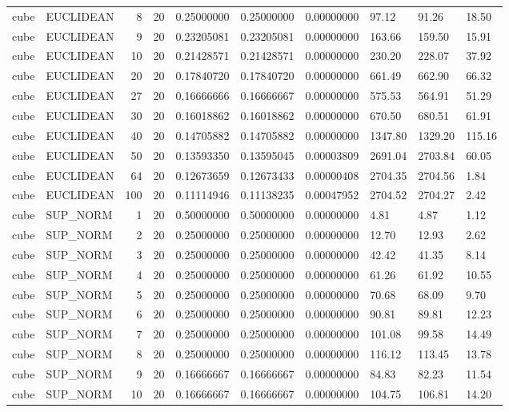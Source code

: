 \begin{longtable}{llrrllllll}
cube & EUCLIDEAN & 8 & 20 & 0.25000000 & 0.25000000 & 0.00000000 & 97.12 & 91.26 & 18.50 \\
cube & EUCLIDEAN & 9 & 20 & 0.23205081 & 0.23205081 & 0.00000000 & 163.66 & 159.50 & 15.91 \\
cube & EUCLIDEAN & 10 & 20 & 0.21428571 & 0.21428571 & 0.00000000 & 230.20 & 228.07 & 37.92 \\
cube & EUCLIDEAN & 20 & 20 & 0.17840720 & 0.17840720 & 0.00000000 & 661.49 & 662.90 & 66.32 \\
cube & EUCLIDEAN & 27 & 20 & 0.16666666 & 0.16666667 & 0.00000000 & 575.53 & 564.91 & 51.29 \\
cube & EUCLIDEAN & 30 & 20 & 0.16018862 & 0.16018862 & 0.00000000 & 670.50 & 680.51 & 61.91 \\
cube & EUCLIDEAN & 40 & 20 & 0.14705882 & 0.14705882 & 0.00000000 & 1347.80 & 1329.20 & 115.16 \\
cube & EUCLIDEAN & 50 & 20 & 0.13593350 & 0.13595045 & 0.00003809 & 2691.04 & 2703.84 & 60.05 \\
cube & EUCLIDEAN & 64 & 20 & 0.12673659 & 0.12673433 & 0.00000408 & 2704.35 & 2704.56 & 1.84 \\
cube & EUCLIDEAN & 100 & 20 & 0.11114946 & 0.11138235 & 0.00047952 & 2704.52 & 2704.27 & 2.42 \\
cube & SUP\_NORM & 1 & 20 & 0.50000000 & 0.50000000 & 0.00000000 & 4.81 & 4.87 & 1.12 \\
cube & SUP\_NORM & 2 & 20 & 0.25000000 & 0.25000000 & 0.00000000 & 12.70 & 12.93 & 2.62 \\
cube & SUP\_NORM & 3 & 20 & 0.25000000 & 0.25000000 & 0.00000000 & 42.42 & 41.35 & 8.14 \\
cube & SUP\_NORM & 4 & 20 & 0.25000000 & 0.25000000 & 0.00000000 & 61.26 & 61.92 & 10.55 \\
cube & SUP\_NORM & 5 & 20 & 0.25000000 & 0.25000000 & 0.00000000 & 70.68 & 68.09 & 9.70 \\
cube & SUP\_NORM & 6 & 20 & 0.25000000 & 0.25000000 & 0.00000000 & 90.81 & 89.81 & 12.23 \\
cube & SUP\_NORM & 7 & 20 & 0.25000000 & 0.25000000 & 0.00000000 & 101.08 & 99.58 & 14.49 \\
cube & SUP\_NORM & 8 & 20 & 0.25000000 & 0.25000000 & 0.00000000 & 116.12 & 113.45 & 13.78 \\
cube & SUP\_NORM & 9 & 20 & 0.16666667 & 0.16666667 & 0.00000000 & 84.83 & 82.23 & 11.54 \\
cube & SUP\_NORM & 10 & 20 & 0.16666667 & 0.16666667 & 0.00000000 & 104.75 & 106.81 & 14.20 \\

\end{longtable}
